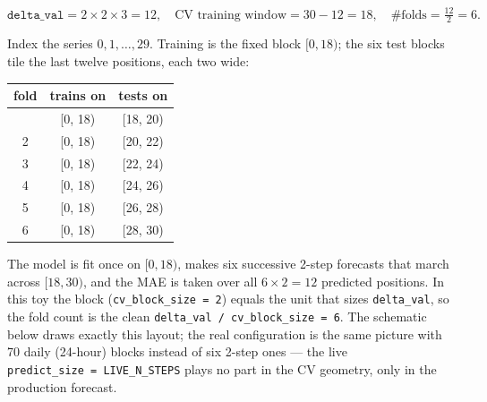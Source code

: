 \documentclass[
  english,
  letterpaper,
]{scrbook}
\newcounter{none} %
\begin{document}
\[
\texttt{delta\_val} = 2 \times 2 \times 3 = 12,\quad
\text{CV training window} = 30 - 12 = 18,\quad
\#\text{folds} = \tfrac{12}{2} = 6.
\]

Index the series \(0,1,\dots,29\). Training is the fixed block
\([0, 18)\); the six test blocks tile the last twelve positions, each
two wide:

{\def\LTcaptype{none} %
\begin{longtable}[]{@{}ccc@{}}
\toprule\noalign{}
fold & trains on & tests on \\
\midrule\noalign{}
\endhead
\bottomrule\noalign{}
\endlastfoot
1 & {[}0, 18) & {[}18, 20) \\
2 & {[}0, 18) & {[}20, 22) \\
3 & {[}0, 18) & {[}22, 24) \\
4 & {[}0, 18) & {[}24, 26) \\
5 & {[}0, 18) & {[}26, 28) \\
6 & {[}0, 18) & {[}28, 30) \\
\end{longtable}
}

The model is fit once on \([0,18)\), makes six successive 2-step
forecasts that march across \([18,30)\), and the MAE is taken over all
\(6 \times 2 = 12\) predicted positions. In this toy the block
(\texttt{cv\_block\_size\ =\ 2}) equals the unit that sizes
\texttt{delta\_val}, so the fold count is the clean
\texttt{delta\_val\ /\ cv\_block\_size\ =\ 6}. The schematic below draws
exactly this layout; the real configuration is the same picture with 70
daily (24-hour) blocks instead of six 2-step ones --- the live
\texttt{predict\_size\ =\ LIVE\_N\_STEPS} plays no part in the CV
geometry, only in the production forecast.
\end{document}
